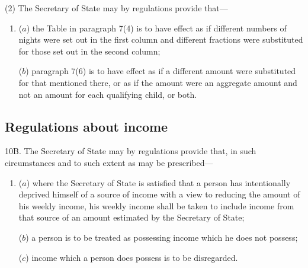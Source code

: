 \documentclass[12pt,a4paper]{article}
\begin{document}
{(2) The Secretary of State may by regulations provide that---
\begin{enumerate}\item[]
($a$) the Table in paragraph 7(4) is to have effect as if different numbers of nights were set out in the first column and different fractions were substituted for those set out in the second column;

($b$) paragraph 7(6) is to have effect as if a different amount were substituted for that mentioned there, or as if the amount were an aggregate amount and not an amount for each qualifying child, or both.
\end{enumerate}


\subsection*{Regulations about income}

10B. The Secretary of State may by regulations provide that, in such circumstances and to such extent as may be prescribed---
\begin{enumerate}\item[]
($a$) where the Secretary of State is satisfied that a person has intentionally deprived himself of a source of income with a view to reducing the amount of his  weekly income, his  weekly income shall be taken to include income from that source of an amount estimated by the Secretary of State;

($b$) a person is to be treated as possessing income which he does not possess;

($c$) income which a person does possess is to be disregarded.
\end{enumerate}


}
\end{document}
